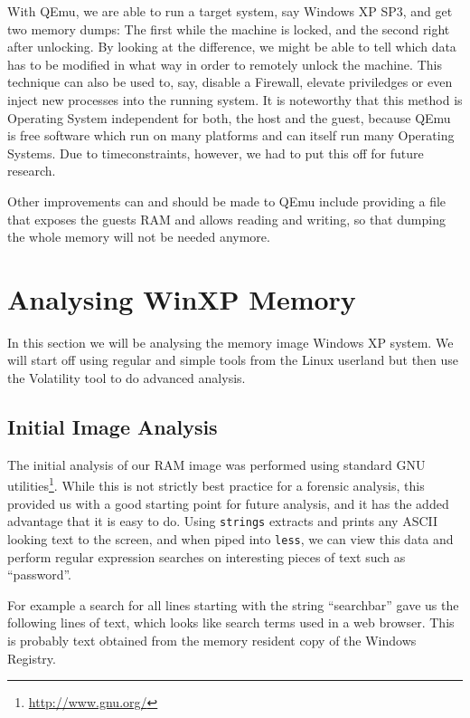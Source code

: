 \documentclass[a4paper,
    11pt,
    normalheadings,
    parindent,
    UKenglish,
    abstracton,
    ]{scrartcl}
\begin{document}
With QEmu, we are able to run a target system, say Windows XP SP3, and get two memory dumps:
The first while the machine is locked, and the second right after unlocking.
By looking at the difference, we might be able to tell which data has to be modified in what way in order to remotely unlock the machine.
This technique can also be used to, say, disable a Firewall, elevate priviledges or even inject new processes into the running system.
It is noteworthy that this method is Operating System independent for both, the host and the guest, because QEmu is free software which run on many platforms and can itself run many Operating Systems.
Due to timeconstraints, however, we had to put this off for future research.

Other improvements can and should be made to QEmu include providing a file that exposes the guests RAM and allows reading and writing, so that dumping the whole memory will not be needed anymore.







\section{Analysing WinXP Memory}
In this section we will be analysing the memory image Windows XP system.
We will start off using regular and simple tools from the Linux userland but then use the Volatility tool to do advanced analysis.


\subsection{Initial Image Analysis}
The initial analysis of our RAM image was performed using standard GNU utilities\footnote{\url{http://www.gnu.org/}}.
While this is not strictly best practice for a forensic analysis, this provided us with a good starting point for future analysis, and it has the added advantage that it is easy to do.
Using \texttt{strings} extracts and prints any ASCII looking text to the screen, and when piped into \texttt{less}, we can view this data and perform regular expression searches on interesting pieces of text such as ``password''.

For example a search for all lines starting with the string ``searchbar'' gave us the following lines of text, which looks like search terms used in a web browser.
This is probably text obtained from the memory resident copy of the Windows Registry.
\end{document}
